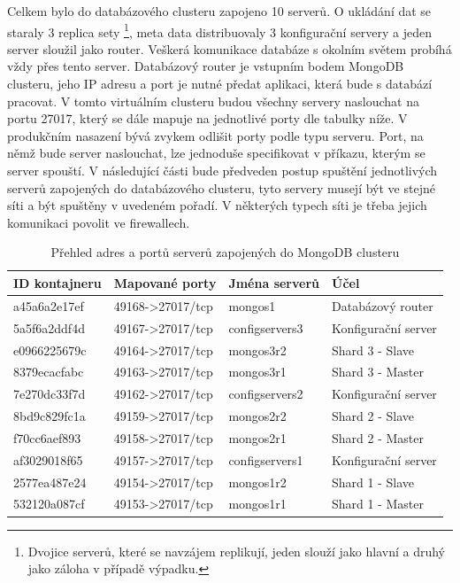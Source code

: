 Celkem bylo do databázového clusteru zapojeno 10 serverů. O ukládání dat se staraly 3 replica sety \footnote{Dvojice serverů, které se navzájem replikují, jeden slouží jako hlavní a druhý jako záloha v případě výpadku.}, meta data distribuovaly 3 konfigurační servery a jeden server sloužil jako router. Veškerá komunikace databáze s okolním světem probíhá vždy přes tento server. Databázový router je vstupním bodem MongoDB clusteru, jeho IP adresu a port je nutné předat aplikaci, která bude s databází pracovat. V tomto virtuálním clusteru budou všechny servery naslouchat na portu 27017, který se dále mapuje na jednotlivé porty dle tabulky níže. V produkčním nasazení bývá zvykem odlišit porty podle typu serveru. Port, na němž bude server naslouchat, lze jednoduše specifikovat v příkazu, kterým se server spouští. V následující části bude předveden postup spuštění jednotlivých serverů zapojených do databázového clusteru, tyto servery musejí být ve stejné síti a být spuštěny v uvedeném pořadí. V některých typech síti je třeba jejich komunikaci povolit ve firewallech.
\begin{table}[h]
\centering
\caption{Přehled adres a portů serverů zapojených do MongoDB clusteru \label{tab:clusterServers}}
\begin{tabular}{ | l | l | l | l | }
\hline
ID kontajneru&Mapované porty&Jména serverů & Účel\\ \hline
a45a6a2e17ef&49168->27017/tcp&mongos1 & Databázový router\\ \hline            
5a5f6a2ddf4d&49167->27017/tcp&configservers3 & Konfigurační server\\ \hline     
e0966225679c&49164->27017/tcp&mongos3r2  & Shard 3 - Slave\\ \hline         
8379ecacfabc&49163->27017/tcp&mongos3r1  & Shard 3 - Master \\ \hline        
7e270dc33f7d&49162->27017/tcp&configservers2 & Konfigurační server\\ \hline      
8bd9c829fc1a&49159->27017/tcp&mongos2r2 & Shard 2 - Slave\\ \hline           
f70cc6aef893&49158->27017/tcp&mongos2r1 & Shard 2 - Master\\ \hline          
af3029018f65	&49157->27017/tcp&configservers1 & Konfigurační server\\ \hline     
2577ea487e24&49154->27017/tcp&mongos1r2 & Shard 1 - Slave\\ \hline         
532120a087cf&49153->27017/tcp&mongos1r1 & Shard 1 - Master\\ \hline 
\end{tabular}

\end{table}
